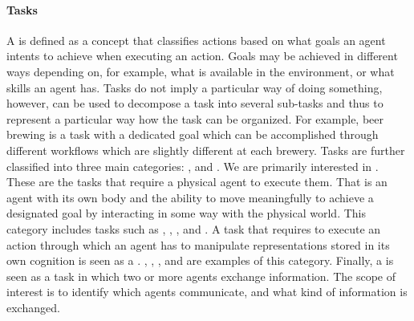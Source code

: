 \paragraph{Tasks}

A  is defined as a concept that classifies actions based on what goals an agent intents to achieve when executing an action.
Goals may be achieved in different ways depending on, for example, what is available in the environment, or what skills an agent has.
Tasks do not imply a particular way of doing something, however,  can be used to decompose a task into several sub-tasks and thus to represent a particular way how the task can be organized.
For example, beer brewing is a task with a dedicated goal which can be accomplished through different workflows which are slightly different at each brewery.
Tasks are further classified into three main categories: ,  and .
We are primarily interested in .
These are the tasks that require a physical agent to execute them.
That is an agent with its own body and the ability to move meaningfully to achieve a designated goal by interacting in some way with the physical world.
This category includes tasks such as , , ,  and . 
A task that requires to execute an action through which an agent has to manipulate representations stored in its own cognition is seen as a .
, , ,  and  are examples of this category.
Finally, a  is seen as a task
in which two or more agents exchange information.
The scope of interest is to identify which agents communicate, and what kind of information is exchanged.

